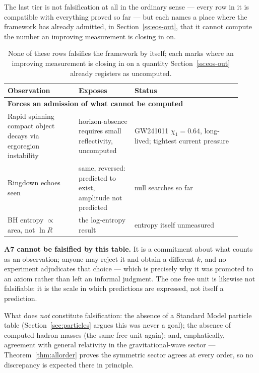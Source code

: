 \documentclass[aps,prd,twocolumn,superscriptaddress,nofootinbib]{revtex4-2}
\begin{document}
The last tier is not falsification at all in the ordinary sense — every
row in it is compatible with everything proved so far — but each names a
place where the framework has already admitted, in
Section~\ref{ss:eos-out}, that it cannot compute the number an
improving measurement is closing in on.

\begin{table}[h]
\centering
\small
\begin{tabular}{p{0.28\linewidth}p{0.22\linewidth}p{0.42\linewidth}}
\toprule
Observation & Exposes & Status \\
\midrule
\multicolumn{3}{l}{\textbf{Forces an admission of what cannot be computed}}\\
Rapid spinning compact object decays via ergoregion instability & horizon-absence requires small reflectivity, uncomputed & GW241011 $\chi_1=0.64$, long-lived; tightest current pressure \\
Ringdown echoes seen & same, reversed: predicted to exist, amplitude not predicted & null searches so far \\
BH entropy $\propto$ area, not $\ln R$ & the log-entropy result & entropy itself unmeasured \\
\bottomrule
\end{tabular}
\caption{None of these rows falsifies the framework by itself; each marks where an improving measurement is closing in on a quantity Section~\ref{ss:eos-out} already registers as uncomputed.}
\label{tab:falsify-admission}
\end{table}
\FloatBarrier

\textbf{A7 cannot be falsified by this table.} It is a commitment about
what counts as an observation; anyone may reject it and obtain a
different $k$, and no experiment adjudicates that choice — which is
precisely why it was promoted to an axiom rather than left an informal
judgment. The one free unit is likewise not falsifiable: it is the scale
in which predictions are expressed, not itself a prediction.

What does \emph{not} constitute falsification: the absence of a Standard
Model particle table (Section~\ref{sec:particles} argues this was never
a goal); the absence of computed hadron masses (the same free unit
again); and, emphatically, agreement with general relativity in the
gravitational-wave sector — Theorem~\ref{thm:allorder} proves the
symmetric sector agrees at every order, so no discrepancy is expected
there in principle.

\end{document}
